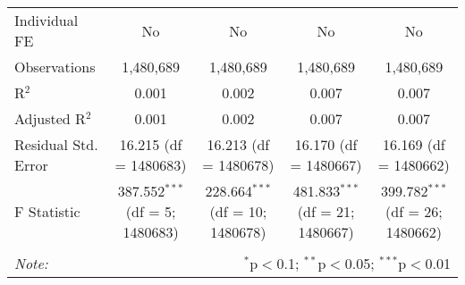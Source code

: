 \documentclass[
]{article}
\begin{document}
\begin{table}[!htbp]
{\begin{tabular}{@{\extracolsep{5pt}}lcccc}
Individual FE & No & No & No & No \\ 
Observations & 1,480,689 & 1,480,689 & 1,480,689 & 1,480,689 \\ 
R$^{2}$ & 0.001 & 0.002 & 0.007 & 0.007 \\ 
Adjusted R$^{2}$ & 0.001 & 0.002 & 0.007 & 0.007 \\ 
Residual Std. Error & 16.215 (df = 1480683) & 16.213 (df = 1480678) & 16.170 (df = 1480667) & 16.169 (df = 1480662) \\ 
F Statistic & 387.552$^{***}$ (df = 5; 1480683) & 228.664$^{***}$ (df = 10; 1480678) & 481.833$^{***}$ (df = 21; 1480667) & 399.782$^{***}$ (df = 26; 1480662) \\ 
\hline 
\hline \\[-1.8ex] 
\textit{Note:}  & \multicolumn{4}{r}{$^{*}$p$<$0.1; $^{**}$p$<$0.05; $^{***}$p$<$0.01} \\ 
\end{tabular}
} 
\end{table} 
\newpage
\end{document}

